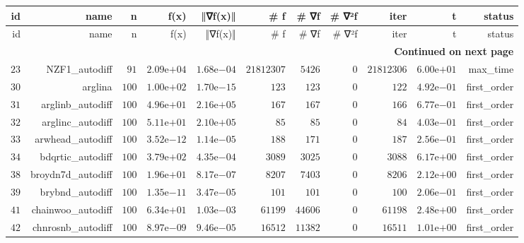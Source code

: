 \documentclass[varwidth=20cm,crop=true]{standalone}
\begin{document}
\begin{longtable}{rrrrrrrrrrr}
  \hline
  id & name & n & f(x) & ‖∇f(x)‖ & # f & # ∇f & # ∇²f & iter & t & status \\\hline
  \endfirsthead
  \hline
  id & name & n & f(x) & ‖∇f(x)‖ & # f & # ∇f & # ∇²f & iter & t & status \\\hline
  \endhead
  \hline
  \multicolumn{11}{r}{{\bfseries Continued on next page}}\\
  \hline
  \endfoot
  \endlastfoot
  \(    23\) & NZF1\_autodiff & \(    91\) & \( 2.09\)e\(+04\) & \( 1.68\)e\(-04\) & \(21812307\) & \(  5426\) & \(     0\) & \(21812306\) & \( 6.00\)e\(+01\) & max\_time \\
  \(    30\) & arglina & \(   100\) & \( 1.00\)e\(+02\) & \( 1.70\)e\(-15\) & \(   123\) & \(   123\) & \(     0\) & \(   122\) & \( 4.92\)e\(-01\) & first\_order \\
  \(    31\) & arglinb\_autodiff & \(   100\) & \( 4.96\)e\(+01\) & \( 2.16\)e\(+05\) & \(   167\) & \(   167\) & \(     0\) & \(   166\) & \( 6.77\)e\(-01\) & first\_order \\
  \(    32\) & arglinc\_autodiff & \(   100\) & \( 5.11\)e\(+01\) & \( 2.10\)e\(+05\) & \(    85\) & \(    85\) & \(     0\) & \(    84\) & \( 4.03\)e\(-01\) & first\_order \\
  \(    33\) & arwhead\_autodiff & \(   100\) & \( 3.52\)e\(-12\) & \( 1.14\)e\(-05\) & \(   188\) & \(   171\) & \(     0\) & \(   187\) & \( 2.56\)e\(-01\) & first\_order \\
  \(    34\) & bdqrtic\_autodiff & \(   100\) & \( 3.79\)e\(+02\) & \( 4.35\)e\(-04\) & \(  3089\) & \(  3025\) & \(     0\) & \(  3088\) & \( 6.17\)e\(+00\) & first\_order \\
  \(    38\) & broydn7d\_autodiff & \(   100\) & \( 1.96\)e\(+01\) & \( 8.17\)e\(-07\) & \(  8207\) & \(  7403\) & \(     0\) & \(  8206\) & \( 2.12\)e\(+00\) & first\_order \\
  \(    39\) & brybnd\_autodiff & \(   100\) & \( 1.35\)e\(-11\) & \( 3.47\)e\(-05\) & \(   101\) & \(   101\) & \(     0\) & \(   100\) & \( 2.06\)e\(-01\) & first\_order \\
  \(    41\) & chainwoo\_autodiff & \(   100\) & \( 6.34\)e\(+01\) & \( 1.03\)e\(-03\) & \( 61199\) & \( 44606\) & \(     0\) & \( 61198\) & \( 2.48\)e\(+00\) & first\_order \\
  \(    42\) & chnrosnb\_autodiff & \(   100\) & \( 8.97\)e\(-09\) & \( 9.46\)e\(-05\) & \( 16512\) & \( 11382\) & \(     0\) & \( 16511\) & \( 1.01\)e\(+00\) & first\_order \\

\end{longtable}
\end{document}
